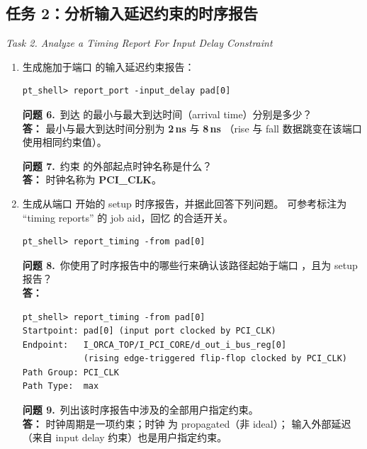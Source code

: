\subsection{任务 2：分析输入延迟约束的时序报告}
\label{lab2:task2}

\noindent\textit{Task 2. Analyze a Timing Report For Input Delay Constraint}

\begin{enumerate}
  \item 生成施加于端口  的输入延迟约束报告：
\begin{lstlisting}
pt_shell> report_port -input_delay pad[0]
\end{lstlisting}

\begin{questionBox}
\textbf{问题 6.}\ 到达  的最小与最大到达时间（arrival time）分别是多少？\\[0.35em]
\textbf{答：} 最小与最大到达时间分别为 \textbf{2\,ns} 与 \textbf{8\,ns}
（rise 与 fall 数据跳变在该端口使用相同约束值）。

\textbf{问题 7.}\ 约束  的外部起点时钟名称是什么？\\[0.35em]
\textbf{答：} 时钟名称为 \textbf{PCI\_CLK}。
\end{questionBox}

  \item 生成从端口  开始的 setup 时序报告，并据此回答下列问题。
        可参考标注为 ``timing reports'' 的 job aid，回忆  的合适开关。
\begin{lstlisting}
pt_shell> report_timing -from pad[0]
\end{lstlisting}

\begin{questionBox}
\textbf{问题 8.}\ 你使用了时序报告中的哪些行来确认该路径起始于端口 ，且为 setup 报告？\\[0.35em]
\textbf{答：}\\
\begin{lstlisting}
pt_shell> report_timing -from pad[0]
Startpoint: pad[0] (input port clocked by PCI_CLK)
Endpoint:   I_ORCA_TOP/I_PCI_CORE/d_out_i_bus_reg[0]
            (rising edge-triggered flip-flop clocked by PCI_CLK)
Path Group: PCI_CLK
Path Type:  max
\end{lstlisting}

\textbf{问题 9.}\ 列出该时序报告中涉及的全部用户指定约束。\\[0.35em]
\textbf{答：} 时钟周期是一项约束；时钟  为 propagated（非 ideal）；
输入外部延迟（来自 input delay 约束）也是用户指定约束。


\end{questionBox}
\end{enumerate}
